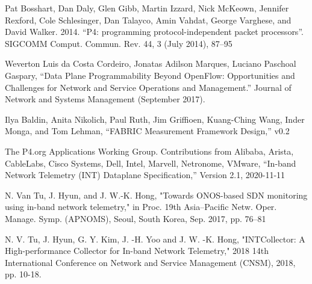 \documentclass[conference]{IEEEtran}
\begin{document}
    \begin{thebibliography}{00}
         Pat Bosshart, Dan Daly, Glen Gibb, Martin Izzard, Nick McKeown, Jennifer Rexford, Cole Schlesinger, Dan Talayco, Amin Vahdat, George Varghese, and David Walker. 2014. “P4: programming protocol-independent packet processors”. SIGCOMM Comput. Commun. Rev. 44, 3 (July 2014), 87–95

         Weverton Luis da Costa Cordeiro, Jonatas Adilson Marques, Luciano Paschoal Gaspary, “Data Plane Programmability Beyond OpenFlow: Opportunities and Challenges for Network and Service Operations and Management.” Journal of Network and Systems Management (September 2017).

         Ilya Baldin, Anita Nikolich, Paul Ruth, Jim Griffioen, Kuang-Ching Wang, Inder Monga, and Tom Lehman, “FABRIC Measurement Framework Design,” v0.2

         The P4.org Applications Working Group. Contributions from Alibaba, Arista, CableLabs, Cisco Systems, Dell, Intel, Marvell, Netronome, VMware, “In-band Network Telemetry (INT) Dataplane Specification,” Version 2.1, 2020-11-11

         N. Van Tu, J. Hyun, and J. W.-K. Hong, "Towards ONOS-based SDN monitoring using in-band network telemetry," in Proc. 19th Asia–Pacific Netw. Oper. Manage. Symp. (APNOMS), Seoul, South Korea, Sep. 2017, pp. 76–81

         N. V. Tu, J. Hyun, G. Y. Kim, J. -H. Yoo and J. W. -K. Hong, "INTCollector: A High-performance Collector for In-band Network Telemetry," 2018 14th International Conference on Network and Service Management (CNSM), 2018, pp. 10-18.
    \end{thebibliography}
\end{document}
